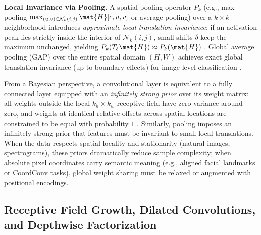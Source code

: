 \documentclass[../../../../master.tex]{subfiles}
\begin{document}
\begin{coremath}
\textbf{Local Invariance via Pooling.} A spatial pooling operator $P_k$ (e.g., max pooling $\max_{(u,v) \in \mathcal{N}_k(i,j)} \mat{H}[c, u, v]$ or average pooling) over a $k \times k$ neighborhood introduces \emph{approximate local translation invariance}: if an activation peak lies strictly inside the interior of $\mathcal{N}_k(i, j)$, small shifts $\delta$ keep the maximum unchanged, yielding $P_k(T_{\delta}\mat{H}) \approx P_k(\mat{H})$ . Global average pooling (GAP) over the entire spatial domain $(H, W)$ achieves exact global translation invariance (up to boundary effects) for image-level classification .
\end{coremath}

\begin{intuition}
\label{box:cnn:prior}
From a Bayesian perspective, a convolutional layer is equivalent to a fully connected layer equipped with an \emph{infinitely strong prior} over its weight matrix: all weights outside the local $k_h \times k_w$ receptive field have zero variance around zero, and weights at identical relative offsets across spatial locations are constrained to be equal with probability $1$ . Similarly, pooling imposes an infinitely strong prior that features must be invariant to small local translations. When the data respects spatial locality and stationarity (natural images, spectrograms), these priors dramatically reduce sample complexity; when absolute pixel coordinates carry semantic meaning (e.g., aligned facial landmarks or CoordConv tasks), global weight sharing must be relaxed or augmented with positional encodings.
\end{intuition}

\subsection{Receptive Field Growth, Dilated Convolutions, and Depthwise Factorization}
\end{document}
